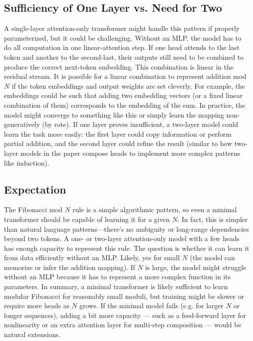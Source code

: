\documentclass{article}
\begin{document}
\subsection*{Sufficiency of One Layer vs. Need for Two}
A single-layer attention-only transformer might handle this pattern if properly parameterized, but it could be challenging. Without an MLP, the model has to do all computation in one linear-attention step. If one head attends to the last token and another to the second-last, their outputs still need to be combined to produce the correct next-token embedding. This combination is linear in the residual stream. It is possible for a linear combination to represent addition mod $N$ if the token embeddings and output weights are set cleverly. For example, the embeddings could be such that adding two embedding vectors (or a fixed linear combination of them) corresponds to the embedding of the sum. In practice, the model might converge to something like this or simply learn the mapping non-generatively (by rote). If one layer proves insufficient, a two-layer model could learn the task more easily: the first layer could copy information or perform partial addition, and the second layer could refine the result (similar to how two-layer models in the paper compose heads to implement more complex patterns like induction).

\subsection*{Expectation}
The Fibonacci mod $N$ rule is a simple algorithmic pattern, so even a minimal transformer should be capable of learning it for a given $N$. In fact, this is simpler than natural language patterns—there’s no ambiguity or long-range dependencies beyond two tokens. A one- or two-layer attention-only model with a few heads has enough capacity to represent this rule. The question is whether it can learn it from data efficiently without an MLP. Likely, yes for small $N$ (the model can memorize or infer the addition mapping). If $N$ is large, the model might struggle without an MLP because it has to represent a more complex function in its parameters. In summary, a minimal transformer is likely sufficient to learn modular Fibonacci for reasonably small moduli, but training might be slower or require more heads as $N$ grows. If the minimal model fails (e.g. for larger $N$ or longer sequences), adding a bit more capacity — such as a feed-forward layer for nonlinearity or an extra attention layer for multi-step composition — would be natural extensions.
\end{document}
